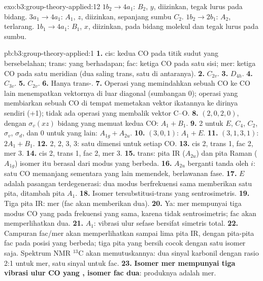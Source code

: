 \begin{solution}{exo:b3:group-theory-applied:12}
$1b_2 \to 4a_1$: $B_2$, $y$, diizinkan, tegak lurus pada bidang. $3a_1 \to 4a_1$:
$A_1$, $z$, diizinkan, sepanjang sumbu $C_2$. $1b_2 \to 2b_1$: $A_2$, terlarang.
$1b_1 \to 4a_1$: $B_1$, $x$, diizinkan, pada bidang molekul dan tegak lurus
pada sumbu.
\end{solution}

\begin{solution}{pb:b3:group-theory-applied:1}
\textbf{1.} cis: kedua CO pada titik sudut yang bersebelahan; trans: yang
berhadapan; fac: ketiga CO pada satu sisi; mer: ketiga CO pada satu meridian
(dua saling trans, satu di antaranya).
\textbf{2.} $C_{2v}$.
\textbf{3.} $D_{4h}$.
\textbf{4.} $C_{3v}$.
\textbf{5.} $C_{2v}$.
\textbf{6.} Hanya trans-.
\textbf{7.} Operasi yang memindahkan sebuah CO ke CO lain menempatkan
vektornya di luar diagonal (sumbangan 0); operasi yang membiarkan sebuah CO
di tempat memetakan vektor ikatannya ke dirinya sendiri (+1); tidak ada
operasi yang membalik vektor C--O.
\textbf{8.}  $(2, 0, 2, 0)$, dengan $\sigma_v(xz)$ bidang yang memuat kedua
CO: $A_1 +
B_1$.
\textbf{9.}  2 untuk $E$, $C_4$, $C_2$, $\sigma_v$, $\sigma_d$, dan 0 untuk
yang lain: $A_{1g} + A_{2u}$.
\textbf{10.} $(3, 0, 1)$: $A_1 + E$.
\textbf{11.} $(3, 1, 3, 1)$: $2A_1 + B_1$.
\textbf{12.} 2, 2, 3, 3: satu dimensi untuk setiap CO.
\textbf{13.} cis 2, trans 1, fac 2, mer 3.
\textbf{14.} cis 2, trans 1, fac 2, mer 3.
\textbf{15.} trans: pita IR ($A_{2u}$) dan pita Raman ($A_{1g}$) isomer itu
berasal dari modus yang berbeda.
\textbf{16.} $A_{2u}$ berganti tanda oleh $i$: satu CO memanjang sementara yang
lain memendek, berlawanan fase.
\textbf{17.} $E$ adalah pasangan terdegenerasi: dua modus berfrekuensi sama
memberikan satu pita, ditambah pita $A_1$.
\textbf{18.} Isomer tersubstitusi-trans yang sentrosimetris.
\textbf{19.} Tiga pita IR: mer (fac akan memberikan dua).
\textbf{20.} Ya: mer mempunyai tiga modus CO yang  pada frekuensi
yang sama, karena tidak sentrosimetris; fac akan memperlihatkan dua.
\textbf{21.} $A_1$: vibrasi ulur sefase bersifat simetris total.
\textbf{22.} Campuran fac/mer akan memperlihatkan sampai lima pita IR, dengan
pita-pita fac pada posisi yang berbeda; tiga pita yang bersih cocok dengan
satu isomer saja. Spektrum NMR ${}^{13}$C akan memutuskannya: dua sinyal
karbonil dengan rasio 2:1 untuk mer, satu sinyal untuk fac.
\textbf{23.} \textbf{Isomer mer mempunyai tiga vibrasi ulur CO yang ,
isomer fac dua}: produknya adalah mer.
\end{solution}
